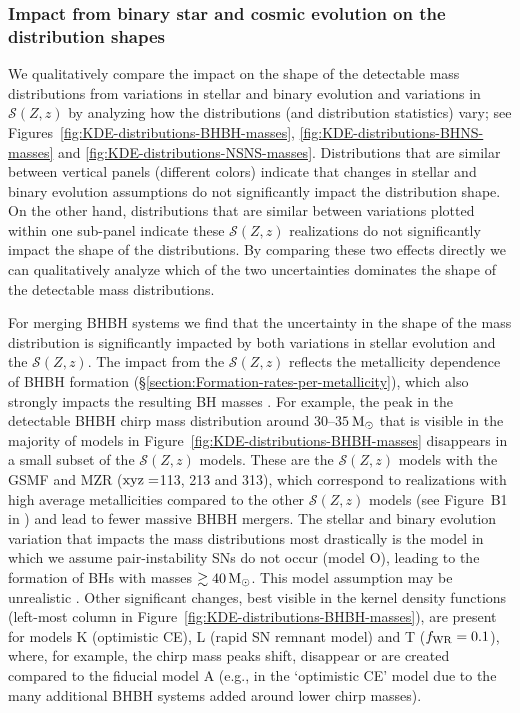 \documentclass[fleqn,usenatbib]{mnras}
\newcommand{\Msun}{\ensuremath{\,\rm{M}_{\odot}}\xspace}
\newcommand{\SFRD}{\ensuremath{\mathcal{S}(Z,z)}\xspace}
\begin{document}
\subsubsection{Impact from binary star and cosmic evolution on the distribution shapes}
\label{sec:Impact-from-massive-binary-star-and-cosmic-evolution-on-the-distribution-shapes}
%
We qualitatively compare the impact on the shape of the detectable mass distributions from variations in stellar and binary evolution and variations in \SFRD by analyzing how the distributions (and distribution statistics) vary; see Figures~\ref{fig:KDE-distributions-BHBH-masses}, \ref{fig:KDE-distributions-BHNS-masses} and \ref{fig:KDE-distributions-NSNS-masses}. Distributions that are similar between vertical panels (different colors) indicate that changes in stellar and binary evolution assumptions  do not significantly impact the distribution shape. On the other hand,  distributions that are similar between variations plotted within one sub-panel indicate these \SFRD realizations do not significantly impact the shape of the distributions. By comparing these two effects directly we can qualitatively analyze which of the two uncertainties dominates the shape of the detectable mass distributions. 


For merging BHBH systems we find that the uncertainty in the shape of the mass distribution is significantly impacted by both variations in stellar evolution and the \SFRD. The impact from the \SFRD reflects the metallicity dependence of BHBH formation (\S\ref{section:Formation-rates-per-metallicity}), which also strongly impacts the resulting \ac{BH} masses \citep[cf.,][]{Belczynski:2010,GiacobboMapelli:2018}. For example, the peak in the detectable \ac{BHBH} chirp mass distribution around $30$--$35$\Msun that is visible in the majority of models in Figure~\ref{fig:KDE-distributions-BHBH-masses} disappears in a small subset of the \SFRD models. These are the \SFRD models with the \citet{2004MNRAS.355..764P} \ac{GSMF} and  \citet{2016MNRAS.456.2140M}  \ac{MZR} ($\rm{xyz} = $113, 213 and 313), which correspond to realizations with high average metallicities compared to the other \SFRD models (see Figure~B1 in  ) and lead to fewer massive \ac{BHBH} mergers. The stellar and binary evolution variation that impacts the mass distributions most drastically is the model in which we assume pair-instability \acp{SN} do not occur (model O), leading to the formation of \acp{BH} with masses $\gtrsim 40\Msun$. This model assumption may be unrealistic \citep[e.g.,][]{2017ApJ...836..244W, Farmer:2019}. Other significant changes, best visible in the kernel density functions (left-most column in Figure~\ref{fig:KDE-distributions-BHBH-masses}), are present for models K (optimistic CE), L (rapid SN remnant model) and T ($f_{\rm{WR}}=0.1$), where, for example, the chirp mass peaks shift,  disappear or are created compared to the fiducial model A (e.g., in the `optimistic CE' model due to the many additional  \ac{BHBH} systems added around lower chirp masses). 
\end{document}
